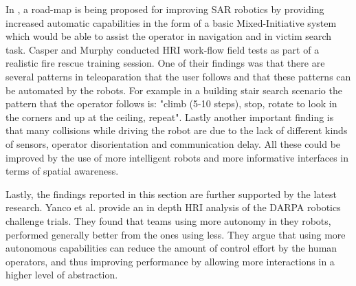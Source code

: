 \documentclass[a4paper,12pt,oneside,openright]{bhamthesis}
\begin{document}
In \cite{Murphy2002}, a road-map is being proposed for improving SAR robotics by providing  increased automatic capabilities in the form of a basic Mixed-Initiative system which would be able to assist the operator in navigation and in victim search task. Casper and Murphy \cite{Casper2002} conducted HRI work-flow field tests as part of a realistic fire rescue training session. One of their findings was that there are several patterns in teleoparation that the user follows and that these patterns can be automated by the robots. For example in a building stair search scenario the pattern that the operator follows is: "climb (5-10 steps), stop, rotate to look in the corners and up at the ceiling, repeat". Lastly another important finding is that many collisions while driving the robot are due to the lack of different kinds of sensors, operator disorientation and communication delay. All these could be improved by the use of more intelligent robots and more informative interfaces in terms of spatial awareness.

Lastly, the findings reported in this section are further supported by the latest research. Yanco et al. \cite{Yanco2015DARPA} provide an in depth HRI analysis of the DARPA robotics challenge trials. They found that teams using more autonomy in they robots, performed generally better from the ones using less. They argue that using more autonomous capabilities can reduce the amount of control effort by the human operators, and thus improving performance by allowing more interactions in a higher level of abstraction.
\end{document}

